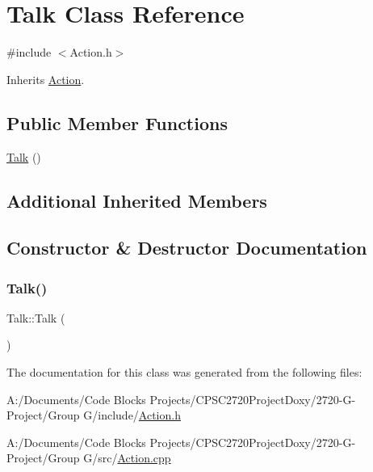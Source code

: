 \hypertarget{class_talk}{}\section{Talk Class Reference}
\label{class_talk}


{\ttfamily \#include $<$Action.\+h$>$}



Inherits \mbox{\hyperlink{class_action}{Action}}.

\subsection*{Public Member Functions}
\begin{DoxyCompactItemize}
\item 
\mbox{\hyperlink{class_talk_a1d324e992139d21b8131ad78e68a0ccf}{Talk}} ()
\end{DoxyCompactItemize}
\subsection*{Additional Inherited Members}


\subsection{Constructor \& Destructor Documentation}
\mbox{\label{class_talk_a1d324e992139d21b8131ad78e68a0ccf}} 
\subsubsection{\texorpdfstring{Talk()}{Talk()}}
{\footnotesize\ttfamily Talk\+::\+Talk (\begin{DoxyParamCaption}{ }\end{DoxyParamCaption})}



The documentation for this class was generated from the following files\+:\begin{DoxyCompactItemize}
\item 
A\+:/\+Documents/\+Code Blocks Projects/\+C\+P\+S\+C2720\+Project\+Doxy/2720-\/\+G-\/\+Project/\+Group G/include/\mbox{\hyperlink{_action_8h}{Action.\+h}}\item 
A\+:/\+Documents/\+Code Blocks Projects/\+C\+P\+S\+C2720\+Project\+Doxy/2720-\/\+G-\/\+Project/\+Group G/src/\mbox{\hyperlink{_action_8cpp}{Action.\+cpp}}\end{DoxyCompactItemize}
